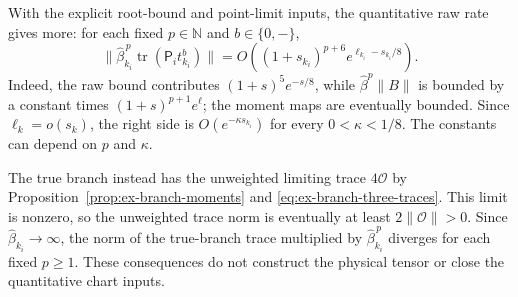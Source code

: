 With the explicit root-bound and point-limit inputs, the quantitative raw
rate gives more: for each fixed $p\in\mathbb N$ and $b\in\{0,-\}$,
\[
 \bigl\|\widehat\beta_{k_i}^{\,p}\operatorname{tr}(\mathsf P_i t^b_{k_i})\bigr\|
 =O\!\left((1+s_{k_i})^{p+6}e^{\ell_{k_i}-s_{k_i}/8}\right).
\]
Indeed, the raw bound contributes $(1+s)^5e^{-s/8}$, while
$\widehat\beta^p\|B\|$ is bounded by a constant times
$(1+s)^{p+1}e^\ell$; the moment maps are eventually bounded. Since
$\ell_k=o(s_k)$, the right side is $O(e^{-\kappa s_{k_i}})$ for every
$0<\kappa<1/8$. The constants can depend on $p$ and $\kappa$.

The true branch instead has the unweighted limiting trace $4\mathcal O$ by
Proposition~\ref{prop:ex-branch-moments} and
\eqref{eq:ex-branch-three-traces}. This limit is nonzero, so the unweighted trace norm is eventually at least
$2\|\mathcal O\|>0$. Since $\widehat\beta_{k_i}\to\infty$, the norm of
the true-branch trace multiplied by $\widehat\beta_{k_i}^{\,p}$ diverges
for each fixed $p\ge1$. These consequences do not construct the physical tensor or close the
quantitative chart inputs.
